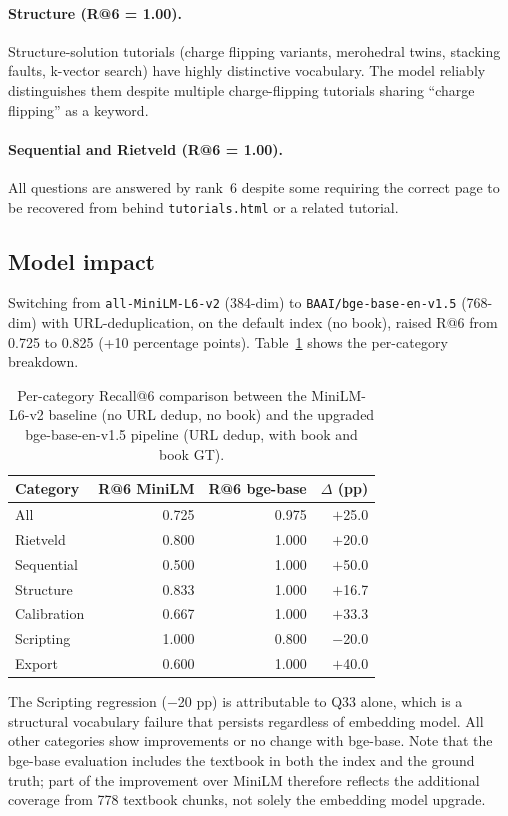 \documentclass[12pt,a4paper]{article}
\begin{document}
\paragraph{Structure (R@6 = 1.00).}
Structure-solution tutorials (charge flipping variants, merohedral twins,
stacking faults, k-vector search) have highly distinctive vocabulary.
The model reliably distinguishes them despite multiple charge-flipping
tutorials sharing ``charge flipping'' as a keyword.

\paragraph{Sequential and Rietveld (R@6 = 1.00).}
All questions are answered by rank~6 despite some requiring the correct
page to be recovered from behind \texttt{tutorials.html} or a related
tutorial.

\subsection{Model impact}

Switching from \texttt{all-MiniLM-L6-v2} (384-dim) to
\texttt{BAAI/bge-base-en-v1.5} (768-dim) with URL-deduplication, on the
default index (no book), raised R@6 from 0.725 to 0.825 (+10 percentage
points).
Table~\ref{tab:modelimpact} shows the per-category breakdown.

\begin{table}[htbp]
  \centering
  \caption{Per-category Recall@6 comparison between the MiniLM-L6-v2
           baseline (no URL dedup, no book) and the upgraded
           bge-base-en-v1.5 pipeline (URL dedup, with book and book GT).}
  \label{tab:modelimpact}
  \begin{tabular}{lrrr}
    \toprule
    Category & R@6 MiniLM & R@6 bge-base & $\Delta$ (pp) \\
    \midrule
    All         & 0.725 & 0.975 & $+$25.0 \\
    Rietveld    & 0.800 & 1.000 & $+$20.0 \\
    Sequential  & 0.500 & 1.000 & $+$50.0 \\
    Structure   & 0.833 & 1.000 & $+$16.7 \\
    Calibration & 0.667 & 1.000 & $+$33.3 \\
    Scripting   & 1.000 & 0.800 & $-$20.0 \\
    Export      & 0.600 & 1.000 & $+$40.0 \\
    \bottomrule
  \end{tabular}
\end{table}

The Scripting regression ($-$20 pp) is attributable to Q33 alone, which
is a structural vocabulary failure that persists regardless of embedding
model.
All other categories show improvements or no change with bge-base.
Note that the bge-base evaluation includes the textbook in both the index
and the ground truth; part of the improvement over MiniLM therefore
reflects the additional coverage from 778 textbook chunks, not solely the
embedding model upgrade.



\end{document}
